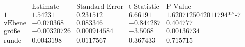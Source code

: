 \[\begin{array}{l|llll}
 \text{} & \text{Estimate} & \text{Standard Error} & \text{t-Statistic} & \text{P-Value} \\
\hline
 1 & 1.54231 & 0.231512 & 6.66191 & \text{1.6207125042011794$\grave{ }$*${}^{\wedge}$-7} \\
 \text{vEbene} & -0.070368 & 0.083346 & -0.844287 & 0.404777 \\
 \text{gr{\" o}{\ss}e} & -0.00320726 & 0.000914584 & -3.5068 & 0.00136734 \\
 \text{runde} & 0.0043198 & 0.0117567 & 0.367433 & 0.715715 \\
\end{array}\]

